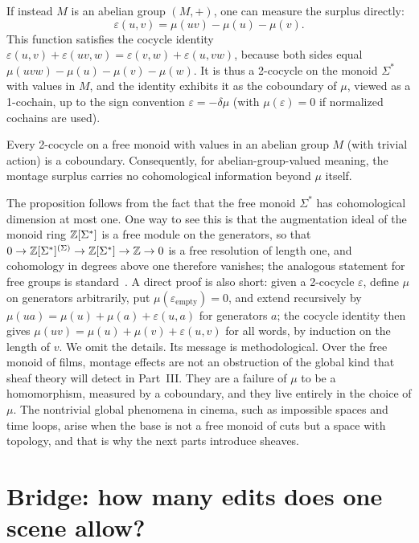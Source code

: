 If instead $M$ is an abelian group $(M,+)$, one can measure the surplus directly:
\[
\varepsilon(u,v)=\mu(uv)-\mu(u)-\mu(v).
\]
This function satisfies the cocycle identity $\varepsilon(u,v)+\varepsilon(uv,w)=\varepsilon(v,w)+\varepsilon(u,vw)$, because both sides equal $\mu(uvw)-\mu(u)-\mu(v)-\mu(w)$. It is thus a 2-cocycle on the monoid $\Sigma^*$ with values in $M$, and the identity exhibits it as the coboundary of $\mu$, viewed as a 1-cochain, up to the sign convention $\varepsilon=-\delta\mu$ (with $\mu(\varepsilon)=0$ if normalized cochains are used).

\begin{proposition}\label{prop:no-higher}
Every 2-cocycle on a free monoid with values in an abelian group $M$ (with trivial action) is a coboundary. Consequently, for abelian-group-valued meaning, the montage surplus carries no cohomological information beyond $\mu$ itself.
\end{proposition}

The proposition follows from the fact that the free monoid $\Sigma^*$ has cohomological dimension at most one. One way to see this is that the augmentation ideal of the monoid ring $\mathbb{Z}[\Sigma^*]$ is a free module on the generators, so that $0\to\mathbb{Z}[\Sigma^*]^{(\Sigma)}\to\mathbb{Z}[\Sigma^*]\to\mathbb{Z}\to0$ is a free resolution of length one, and cohomology in degrees above one therefore vanishes; the analogous statement for free groups is standard~\cite{brown1982}. A direct proof is also short: given a 2-cocycle $\varepsilon$, define $\mu$ on generators arbitrarily, put $\mu(\varepsilon_{\text{empty}})=0$, and extend recursively by $\mu(ua)=\mu(u)+\mu(a)+\varepsilon(u,a)$ for generators $a$; the cocycle identity then gives $\mu(uv)=\mu(u)+\mu(v)+\varepsilon(u,v)$ for all words, by induction on the length of $v$. We omit the details. Its message is methodological. Over the free monoid of films, montage effects are not an obstruction of the global kind that sheaf theory will detect in Part~III. They are a failure of $\mu$ to be a homomorphism, measured by a coboundary, and they live entirely in the choice of $\mu$. The nontrivial global phenomena in cinema, such as impossible spaces and time loops, arise when the base is not a free monoid of cuts but a space with topology, and that is why the next parts introduce sheaves.

\section{Bridge: how many edits does one scene allow?}

